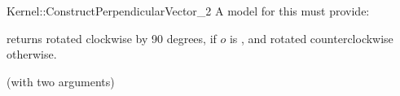 \begin{ccRefFunctionObjectConcept}{Kernel::ConstructPerpendicularVector_2}
A model for this must provide:


{returns  rotated clockwise by 90 degrees, if $o$ is
, and rotated counterclockwise otherwise.
}

\ccRefines
{} (with two arguments)

\ccSeeAlso
{} \\

\end{ccRefFunctionObjectConcept}
